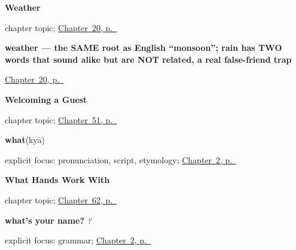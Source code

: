 \noindent\begin{minipage}[t]{\linewidth}
\raggedright
\textbf{Weather}\par
\footnotesize chapter topic; \hyperref[ch:hi-weather]{Chapter~20, p.~\pageref*{ch:hi-weather}}
\end{minipage}\par\smallskip

\noindent\begin{minipage}[t]{\linewidth}
\raggedright
\textbf{weather — the SAME root as English \textquotedblleft{}monsoon\textquotedblright{}; rain has TWO words that sound alike but are NOT related, a real false-friend trap}\enspace\emph{}\par
\footnotesize \hyperref[ch:hi-weather]{Chapter~20, p.~\pageref*{ch:hi-weather}}
\end{minipage}\par\smallskip

\noindent\begin{minipage}[t]{\linewidth}
\raggedright
\textbf{Welcoming a Guest}\par
\footnotesize chapter topic; \hyperref[ch:hi-welcoming-a-guest]{Chapter~51, p.~\pageref*{ch:hi-welcoming-a-guest}}
\end{minipage}\par\smallskip

\noindent\begin{minipage}[t]{\linewidth}
\raggedright
\textbf{what}\enspace\emph{}\enspace(kyā)\par
\footnotesize explicit focus: pronunciation, script, etymology; \hyperref[ch:introductions]{Chapter~2, p.~\pageref*{ch:introductions}}
\end{minipage}\par\smallskip

\noindent\begin{minipage}[t]{\linewidth}
\raggedright
\textbf{What Hands Work With}\par
\footnotesize chapter topic; \hyperref[ch:hi-what-hands-work-with]{Chapter~62, p.~\pageref*{ch:hi-what-hands-work-with}}
\end{minipage}\par\smallskip

\noindent\begin{minipage}[t]{\linewidth}
\raggedright
\textbf{what's your name?}\enspace\emph{   ?}\par
\footnotesize explicit focus: grammar; \hyperref[ch:introductions]{Chapter~2, p.~\pageref*{ch:introductions}}
\end{minipage}\par\smallskip

